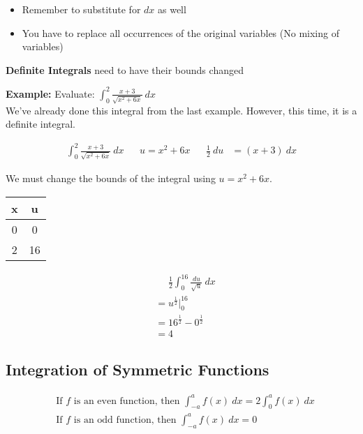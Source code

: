 \documentclass{template}
\begin{document}
\begin{itemize}
    \item Remember to substitute for $dx$ as well
    \item You have to replace all occurrences of the original variables (No mixing of variables)
\end{itemize}

\textbf{Definite Integrals} need to have their bounds changed

\vspace{3 mm}
\begin{tcolorbox}
\textbf{Example:} Evaluate: $\displaystyle \int_0^2 \frac{x+3}{\sqrt{x^2 + 6x}} \ dx$ \\
We've already done this integral from the last example. However, this time, it is a definite integral.

\begin{align*}
    \int_0^2 \frac{x+3}{\sqrt{x^2 + 6x}} \ dx && u = x^2 + 6x && \frac{1}{2} \ du &= (x + 3) \ dx
\end{align*}

We must change the bounds of the integral using $u = x^2 + 6x$.

\begin{center}
    \begin{tabular}{c|c}
        x & u \\ \hline	
        0 & 0 \\
        2 & 16
    \end{tabular}
\end{center}

\begin{align*}
    &\phantom{{}={}} \frac{1}{2}\int_0^{16} \frac{du}{\sqrt{u}} \ dx \\
    &= u^{\tfrac{1}{2}}\big|_0^{16} \\
    &= 16^{\tfrac{1}{2}}-0^{\tfrac{1}{2}} \\
    &= 4
\end{align*}
\end{tcolorbox}

\subsection{Integration of Symmetric Functions}
\begin{mdframed}
    \begin{align*}
        &\text{If $f$ is an even function, then $\int_{-a}^a f(x) \ dx = 2\int_0^a f(x) \ dx$} \\
        &\text{If $f$ is an odd function, then $\int_{-a}^a f(x) \ dx = 0$}
    \end{align*}
\end{mdframed}
\end{document}
